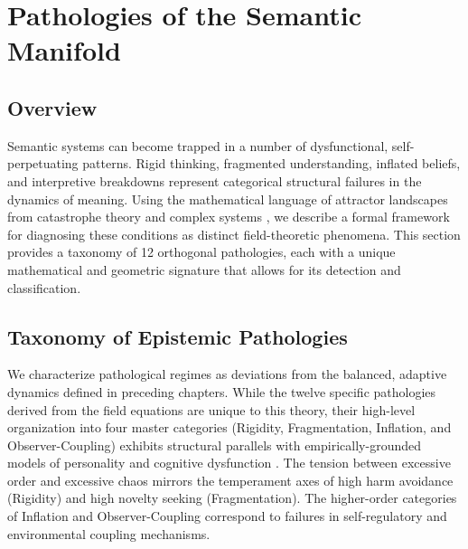 \chapter{Pathologies of the Semantic Manifold}
\label{16:pathologies_of_the_semantic_manifold}


\section{Overview}
\label{16.1:overview}

Semantic systems can become trapped in a number of dysfunctional, self-perpetuating patterns. Rigid thinking, fragmented understanding, inflated beliefs, and interpretive breakdowns represent categorical structural failures in the dynamics of meaning. Using the mathematical language of attractor landscapes from catastrophe theory and complex systems \autocite{Thom1975, Zeeman1977, Milnor1985}, we describe a formal framework for diagnosing these conditions as distinct field-theoretic phenomena. This section provides a taxonomy of 12 orthogonal pathologies, each with a unique mathematical and geometric signature that allows for its detection and classification.


\section{Taxonomy of Epistemic Pathologies}
\label{16.2:taxonomy_of_epistemic_pathologies}

We characterize pathological regimes as deviations from the balanced, adaptive dynamics defined in preceding chapters. While the twelve specific pathologies derived from the field equations are unique to this theory, their high-level organization into four master categories (Rigidity, Fragmentation, Inflation, and Observer-Coupling) exhibits structural parallels with empirically-grounded models of personality and cognitive dysfunction \autocite{Cloninger1993}. The tension between excessive order and excessive chaos mirrors the temperament axes of high harm avoidance (Rigidity) and high novelty seeking (Fragmentation). The higher-order categories of Inflation and Observer-Coupling correspond to failures in self-regulatory and environmental coupling mechanisms. 

